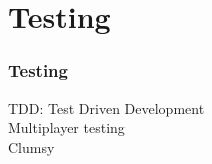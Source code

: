 \documentclass{beamer}
\begin{document}
\section{Testing}
\begin{frame}
	\frametitle{Testing}
TDD: Test Driven Development \\
Multiplayer testing \\
Clumsy \\
\end{frame}
\end{document}
